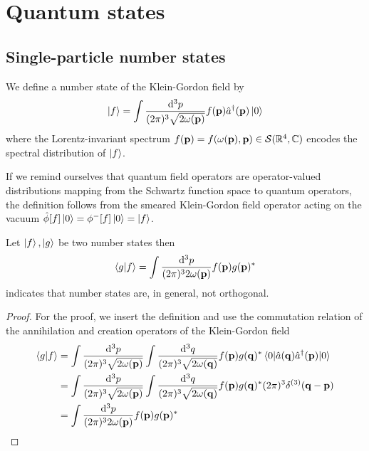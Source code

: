 \section{Quantum states}

\subsection{Single-particle number states}

\begin{definition}\label{def:single_particle_number_state}
	We define a number state of the Klein-Gordon field by
	\begin{equation}
		\ket{f}
		=
		\int\frac{\dd[3]{p}}{(2\pi)^3\sqrt{2\omega(\vb{p})}}
		f(\vb{p})
		\hat{a}^\dagger(\vb{p})
		\ket{0}
	\end{equation}
	where the Lorentz-invariant spectrum $f(\vb{p})=f(\omega(\vb{p}),\vb{p})\in\mathcal{S}(\mathbb{R}^4,\mathbb{C})$ encodes the spectral distribution of $\ket{f}$.
\end{definition}
\begin{remark}
	If we remind ourselves that quantum field operators are operator-valued distributions mapping from the Schwartz function space to quantum operators, the definition follows from the smeared Klein-Gordon field operator acting on the vacuum $\hat\phi[f]\ket{0}=\phi^-[f]\ket{0}=\ket{f}$.
\end{remark}

\begin{lemma}\label{th:number_states_non_orthogonal}
	Let $\ket{f},\ket{g}$ be two number states then
	\begin{equation}
		\braket{g}{f}
		=
		\int\frac{\dd[3]{p}}{(2\pi)^32\omega(\vb{p})}
		f(\vb{p})g(\vb{p})^*
	\end{equation}
	indicates that number states are, in general, not orthogonal.
\end{lemma}
\begin{proof}
	For the proof, we insert the definition and use the commutation relation of the annihilation and creation operators of the Klein-Gordon field
	\begin{equation}
		\begin{split}
			\bra{g}\ket{f}
			&=
			\int\frac{\dd[3]{p}}{(2\pi)^3\sqrt{2\omega(\vb{p})}}
			\int\frac{\dd[3]{q}}{(2\pi)^3\sqrt{2\omega(\vb{q})}}
			f(\vb{p})g(\vb{q})^*
			\expval{\hat{a}(\vb{q})\hat{a}^\dagger(\vb{p})}{0}
			\\
			&=
			\int\frac{\dd[3]{p}}{(2\pi)^3\sqrt{2\omega(\vb{p})}}
			\int\frac{\dd[3]{q}}{(2\pi)^3\sqrt{2\omega(\vb{q})}}
			f(\vb{p})g(\vb{q})^*
			(2\pi)^3\delta^{(3)}(\vb{q}-\vb{p})
			\\
			&=
			\int\frac{\dd[3]{p}}{(2\pi)^32\omega(\vb{p})}
			f(\vb{p})g(\vb{p})^*
		\end{split}
	\end{equation}
\end{proof}

